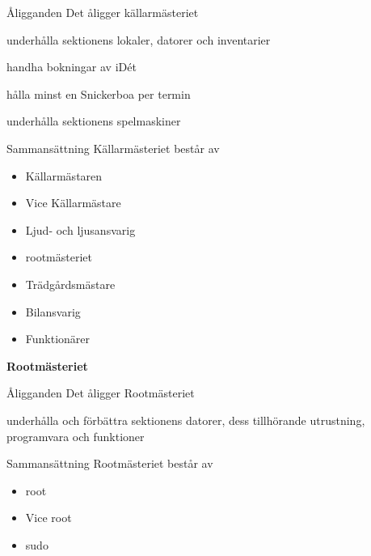 \documentclass[pdfbookmarks,a4paper,11pt]{article}
\newlength{\itemcollength}
\newenvironment{reglemlista}{%
  \begin{list}{}{%
      \setlength{\labelwidth}{\itemcollength}%
      \setlength{\leftmargin}{\labelwidth + \labelsep}%
      \renewcommand{\makelabel}[1]{%
        \raisebox{0pt}[1ex][0pt]{%
          \makebox[\labelwidth][l]{%
            \parbox[t]{\itemcollength}{%
              \raggedright\hspace{0pt}##1}}}\hfill}%
      }}{%
  \end{list}}
\begin{document}
\begin{reglemlista}

	\item[Åligganden]
	Det åligger källarmästeriet
	\begin{attlista}
		\item underhålla sektionens lokaler, datorer och inventarier
		\item handha bokningar av iDét
		\item hålla minst en Snickerboa per termin
		\item underhålla sektionens spelmaskiner
	\end{attlista}


	\item[Sammansättning]
	Källarmästeriet består av
	\begin{itemize}
		\item Källarmästaren
		\item Vice Källarmästare
		\item Ljud- och ljusansvarig
		\item rootmästeriet
		\item Trädgårdsmästare
        \item Bilansvarig
		\item Funktionärer
	\end{itemize}

	\item[\textbf{Rootmästeriet}]

	\item[Åligganden]
	Det åligger Rootmästeriet
	\begin{attlista}
		\item underhålla och förbättra sektionens datorer, dess tillhörande utrustning, programvara och funktioner
	\end{attlista}

	\item[Sammansättning]
	Rootmästeriet består av
	\begin{itemize}
		\item root
        \item Vice root
		\item sudo
	\end{itemize}

\end{reglemlista}
\end{document}
